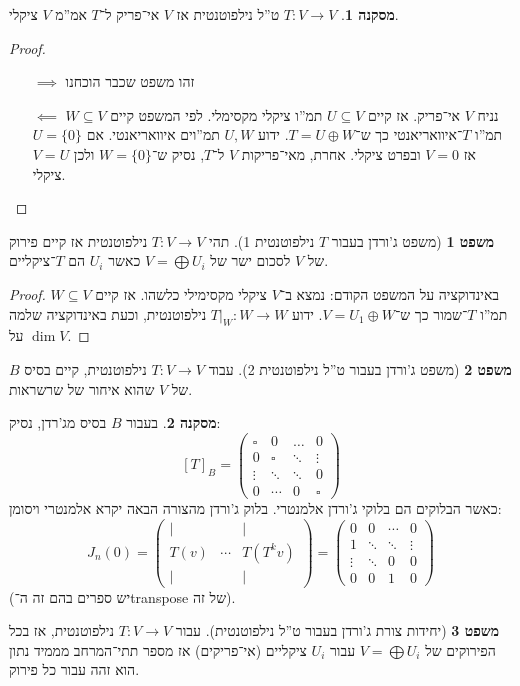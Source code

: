 \documentclass[a4paper]{article}
\newcommand\co        {\colon}
\newcommand\pms[1]    {\begin{pmatrix}
		#1
\end{pmatrix}}
\theoremstyle{definition}
\newtheorem{Theorem}{\color{myblue}משפט}
\newtheorem{Collary}{\color{mymagenta}מסקנה}
\newcommand\cola [1] {\begin{Collary}#1\end{Collary}}
\begin{document}
	\cola{$T \co V \to V$ ט''ל נילפוטנטית אז $V$ אי־פריק ל־$T$ אמ''מ $V$ ציקלי. }
	\begin{proof}\,
		\begin{itemize}
			\item[$\implies$]זהו משפט שכבר הוכחנו
			\item[$\impliedby$]נניח $V$ אי־פריק. אז קיים $U \subseteq V$ תמ''ו ציקלי מקסימלי. לפי המשפט קיים $W \subseteq V$ תמ''ו $T$־איוואריאנטי כך ש־$T = U \oplus W$. ידוע $U, W$ תמ''וים איוואריאנטי. אם $U = \{0\}$ אז $V = 0$ ובפרט ציקלי. אחרת, מאי־פריקות $V$ ל־$T$, נסיק ש־$W = \{0\}$ ולכן $V = U$ ציקלי. 
		\end{itemize}
	\end{proof}
	
	\begin{Theorem}[משפט ג'ורדן בעבור $T$ נילפוטנטית 1]
		תהי $T \co V \to V$ נילפוטנטית אז קיים פירוק של $V$ לסכום ישר של $V = \bigoplus U_i$ כאשר $U_i$ הם $T$־ציקליים. 
	\end{Theorem}
	\begin{proof}
		באינדוקציה על המשפט הקודם: נמצא ב־$V$ ציקלי מקסימילי כלשהו. אז קיים $W \subseteq V$ תמ''ו $T$־שמור כך ש־$V = U_1 \oplus W$. ידוע $T|_{W} \co W \to W$ נילפוטנטית, וכעת באינדוקציה שלמה על $\dim V$. 
	\end{proof}
	
	\begin{Theorem}[משפט ג'ורדן בעבור ט''ל נילפוטנטית 2]
		עבוד $T \co V \to V$ נילפוטנטית, קיים בסיס $B$ של $V$ שהוא איחור של שרשראות. 
	\end{Theorem}
	\cola{בעבור $B$ בסיס מג'רדן, נסיק: 
		\[ [T]_B = \pms{\square & 0 & \dots &0 \\ 0 & \square & \ddots & \vdots \\ \vdots & \ddots & \ddots & 0 \\ 0 & \cdots & 0 & \square} \]
		כאשר הבלוקים הם בלוקי ג'ורדן אלמנטרי. בלוק ג'ורדן מהצורה הבאה יקרא אלמנטרי ויסומן: 
		\[ J_n(0) = \pms{\vert &  & \vert \\ T(v) & \cdots & T(T^kv) \\ \vert & & \vert} = \pms{0 & 0 & \cdots & 0 \\ 1 & \ddots & \ddots & \vdots \\ \vdots & \ddots & 0 & 0 \\ 0 & 0 & 1 & 0} \]
		(יש ספרים בהם זה ה־transpose של זה). }
	
	\begin{Theorem}[יחידות צורת ג'ורדן בעבור ט''ל נילפוטנטית]
		עבור $T \co V \to V$ נילפוטנטית, אז בכל הפירוקים של $V = \bigoplus U_i$ עבור $U_i$ ציקליים (אי־פריקים) אז מספר תתי־המרחב מממיד נתון הוא זהה עבור כל פירוק. 
	\end{Theorem}
	
\end{document}
